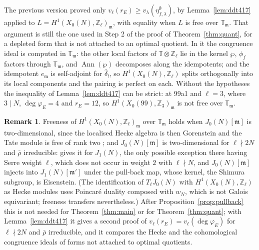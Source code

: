 \documentclass[11pt]{amsart}
\theoremstyle{definition}
\newtheorem{remark}[theorem]{Remark}
\newcommand{\Z}{\mathbb{Z}}
\newcommand{\T}{\mathbb{T}}
\newcommand{\degphi}{\deg\varphi_E}
\begin{document}
The previous version proved only $v_\ell(r_E)\ge v_\lambda(\eta^\emptyset_{f,\lambda})$, by Lemma~\ref{lem:ddt417} applied to $L=H^1(X_0(N),\Z_\ell)_{\mathfrak m}$, with equality when $L$ is free over $\T_{\mathfrak m}$. That argument is still the one used in Step 2 of the proof of Theorem~\ref{thm:quant}, for a depleted form that is not attached to an optimal quotient. In it the congruence ideal is computed in $\T_{\mathfrak m}$: the other local factors of $\T\otimes\Z_\ell$ lie in the kernel $\wp$, $\phi_f$ factors through $\T_{\mathfrak m}$, and $\operatorname{Ann}(\wp)$ decomposes along the idempotents; and the idempotent $e_{\mathfrak m}$ is self-adjoint for $\hat\delta_!$, so $H^1(X_0(N),\Z_\ell)$ splits orthogonally into its local components and the pairing is perfect on each. Without the hypotheses the inequality of Lemma~\ref{lem:ddt417} can be strict: at 99a1 and $\ell=3$, where $3\mid N$, $\degphi=4$ and $r_E=12$, so $H^1(X_0(99),\Z_3)_{\mathfrak m}$ is not free over $\T_{\mathfrak m}$.

\begin{remark}\label{rem:free}
Freeness of $H^1(X_0(N),\Z_\ell)_{\mathfrak m}$ over $\T_{\mathfrak m}$ holds when $J_0(N)[\mathfrak m]$ is two-dimensional, since the localised Hecke algebra is then Gorenstein and the Tate module is free of rank two \cite{Tilouine97}; and $J_0(N)[\mathfrak m]$ is two-dimensional for $\ell\nmid2N$ and $\bar\rho$ irreducible: \cite[Theorem 3.5]{RibetStein} gives it for $J_1(N)$, the only possible exception there having Serre weight $\ell$, which does not occur in weight $2$ with $\ell\nmid N$, and $J_0(N)[\mathfrak m]$ injects into $J_1(N)[\mathfrak m']$ under the pull-back map, whose kernel, the Shimura subgroup, is Eisenstein. (The identification of $T_\ell J_0(N)$ with $H^1(X_0(N),\Z_\ell)$ as Hecke modules uses Poincar\'e duality composed with $w_N$, which is not Galois equivariant; freeness transfers nevertheless.) After Proposition~\ref{prop:pullback} this is not needed for Theorem~\ref{thm:main} or for Theorem~\ref{thm:quant}; with Lemma~\ref{lem:ddt417} it gives a second proof of $v_\ell(r_E)=v_\ell(\degphi)$ for $\ell\nmid2N$ and $\bar\rho$ irreducible, and it compares the Hecke and the cohomological congruence ideals of forms not attached to optimal quotients.
\end{remark}
\end{document}
